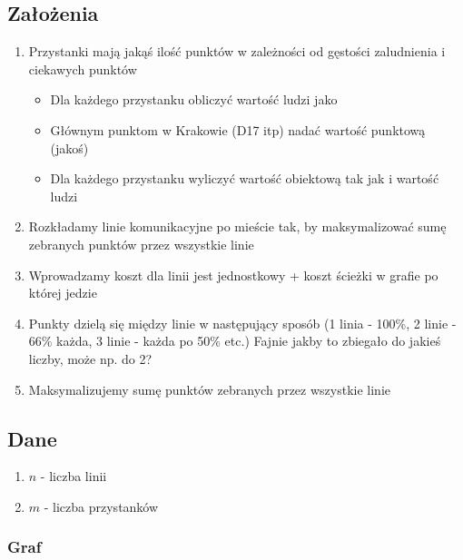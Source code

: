 \documentclass[12pt,a4paper,openright]{mwrep}
\begin{document}
\subsection{Założenia}

\begin{enumerate}
	\item Przystanki mają jakąś ilość punktów w zależności od gęstości zaludnienia i ciekawych punktów
	\begin{itemize}
		\item Dla każdego przystanku obliczyć wartość ludzi jako %
		\item Głównym punktom w Krakowie (D17 itp) nadać wartość punktową (jakoś)
		\item Dla każdego przystanku wyliczyć wartość obiektową tak jak i wartość ludzi
	\end{itemize}
	\item Rozkładamy linie komunikacyjne po mieście tak, by maksymalizować sumę zebranych punktów przez wszystkie linie
	\item Wprowadzamy koszt dla linii jest jednostkowy + koszt ścieżki w grafie po której jedzie
	\item Punkty dzielą się między linie w następujący sposób (1 linia - 100\%, 2 linie - 66\% każda, 3 linie - każda po 50\% etc.) Fajnie jakby to zbiegało do jakieś liczby, może np. do 2?
	\item Maksymalizujemy sumę punktów zebranych przez wszystkie linie
\end{enumerate}

\subsection{Dane}
	\begin{enumerate}
		\item $n$ - liczba linii
		\item $m$ - liczba przystanków
	\end{enumerate}

\subsubsection{Graf}
\end{document}

